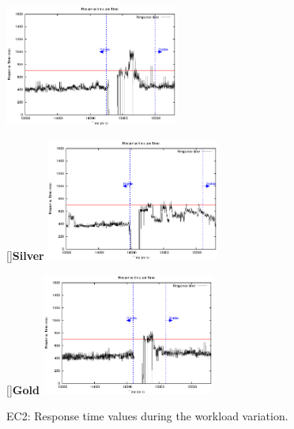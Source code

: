 \begin{figure}[htb]
\vspace{-5mm}
	\begin{minipage}[b]{0.32\linewidth}
		\vspace{-3mm}
		\includegraphics[height=4cm]{images/exps2011/low/ec2/proxyDataPoints_output_filtered.eps}	
	\end{minipage}
	\hfill
	\begin{minipage}[b]{0.32\linewidth}
		[]{{\scriptsize \textbf{Silver}}}
		\vspace{-3mm}
		\includegraphics[height=4cm]{images/exps2011/medium/ec2/proxyDataPoints_output_filtered.eps}
	\end{minipage}
\hfill
\begin{minipage}[b]{0.32\linewidth}
		[]{{\scriptsize \textbf{Gold}}}
		\vspace{-3mm}
		\includegraphics[height=4cm]{images/exps2011/high/ec2/proxyDataPoints_output_filtered.eps}
	\end{minipage}
\vspace{-4mm}
\caption{EC2: Response time values during the workload variation.}
\label{fig:EC2ResponseTime}
\end{figure}


